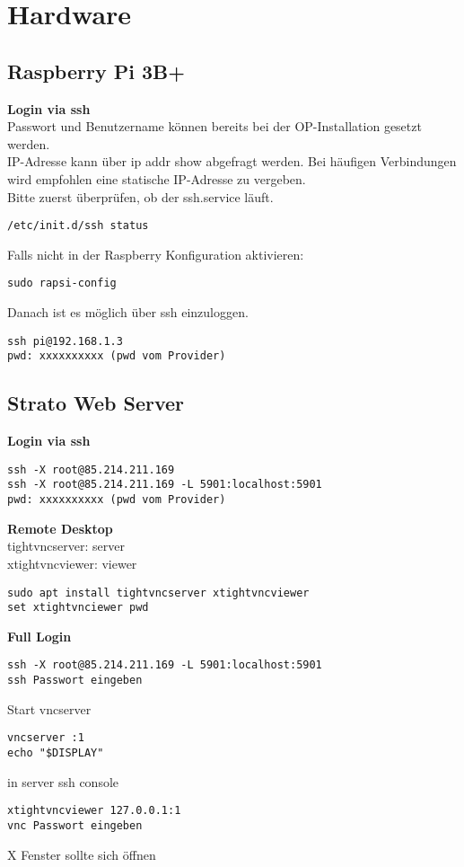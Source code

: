 \newpage
\section{Hardware}

\subsection{Raspberry Pi 3B+}
\textbf{Login via ssh}\\
Passwort und Benutzername können bereits bei der OP-Installation gesetzt werden.\\
IP-Adresse kann über ip addr show abgefragt werden. Bei häufigen Verbindungen wird empfohlen 
eine statische IP-Adresse zu vergeben.\\

Bitte zuerst überprüfen, ob der ssh.service läuft.
\begin{verbatim}/etc/init.d/ssh status\end{verbatim}
Falls nicht in der Raspberry Konfiguration aktivieren:
\begin{verbatim}
sudo rapsi-config
\end{verbatim}
Danach ist es möglich über ssh einzuloggen.
\begin{verbatim}
ssh pi@192.168.1.3
pwd: xxxxxxxxxx (pwd vom Provider)
\end{verbatim}

\subsection{Strato Web Server}
\textbf{Login via ssh}
\begin{verbatim}
ssh -X root@85.214.211.169
ssh -X root@85.214.211.169 -L 5901:localhost:5901
pwd: xxxxxxxxxx (pwd vom Provider)
\end{verbatim}
\textbf{Remote Desktop}\\
tightvncserver: server\\
xtightvncviewer: viewer
\begin{verbatim}sudo apt install tightvncserver xtightvncviewer
set xtightvnciewer pwd
\end{verbatim}

\textbf{Full Login}
\begin{verbatim}
ssh -X root@85.214.211.169 -L 5901:localhost:5901
ssh Passwort eingeben
\end{verbatim}
Start vncserver
\begin{verbatim}
vncserver :1
echo "$DISPLAY"
\end{verbatim}
in server ssh console
\begin{verbatim}xtightvncviewer 127.0.0.1:1
vnc Passwort eingeben
\end{verbatim}
X Fenster sollte sich öffnen\\


